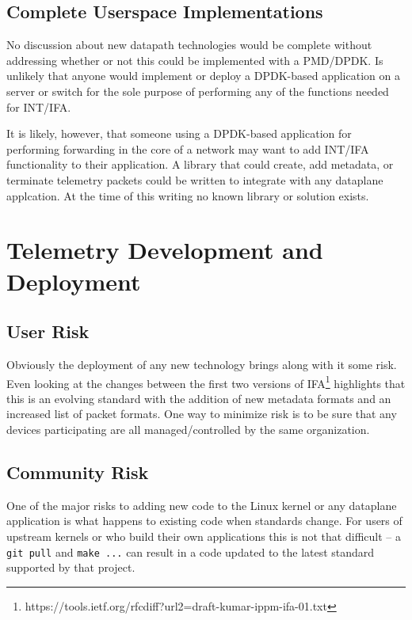\documentclass[letterpaper,twocolumn,10pt]{article}
\begin{document}
\subsection{Complete Userspace Implementations}

No discussion about new datapath technologies would be complete without
addressing whether or not this could be implemented with a PMD/DPDK.  Is
unlikely that anyone would implement or deploy a DPDK-based application
on a server or switch for the sole purpose of performing any of the
functions needed for INT/IFA.

It is likely, however, that someone using a DPDK-based application for
performing forwarding in the core of a network may want to add INT/IFA
functionality to their application.  A library that could create, add
metadata, or terminate telemetry packets could be written to integrate
with any dataplane applcation.  At the time of this writing no known
library or solution exists.

\section{Telemetry Development and Deployment}

\subsection{User Risk}

Obviously the deployment of any new technology brings along with it some
risk.  Even looking at the changes between the first two versions of
IFA\footnote{https://tools.ietf.org/rfcdiff?url2=draft-kumar-ippm-ifa-01.txt} 
highlights that this is an evolving standard with the addition of new
metadata formats and an increased list of packet formats.  One way to
minimize risk is to be sure that any devices participating are all
managed/controlled by the same organization.

\subsection{Community Risk}

One of the major risks to adding new code to the Linux kernel or any
dataplane application is what happens to existing code when standards
change.  For users of upstream kernels or who build their own
applications this is not that difficult -- a \texttt{git pull} and
\texttt{make ...} can result in a code updated to the latest standard
supported by that project.
\end{document}

